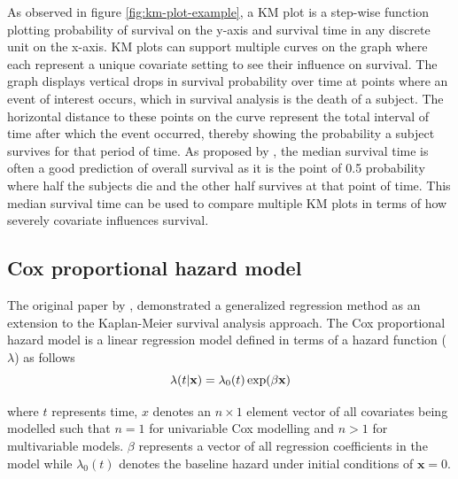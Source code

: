 \documentclass{l4proj}
\begin{document}
As observed in figure \ref{fig:km-plot-example}, a KM plot is a step-wise function plotting probability of survival on the y-axis and survival time in any discrete unit on the x-axis. KM plots can support multiple curves on the graph where each represent a unique covariate setting to see their influence on survival. The graph displays vertical drops in survival probability over time at points where an event of interest occurs, which in survival analysis is the death of a subject. The horizontal distance to these points on the curve represent the total interval of time after which the event occurred, thereby showing the probability a subject survives for that period of time. As proposed by \cite{bewick2004statistics}, the median survival time is often a good prediction of overall survival as it is the point of 0.5 probability where half the subjects die and the other half survives at that point of time. This median survival time can be used to compare multiple KM plots in terms of how severely  covariate influences survival. 


\subsection{Cox proportional hazard model} \label{cph-background}
The original paper by \cite{cox1972regression}, demonstrated a generalized regression method as an extension to the Kaplan-Meier survival analysis approach. The Cox proportional hazard model is a linear regression model defined in terms of a hazard function (\(\lambda\)) as follows
\begin{equation}
    \centering
    \lambda (t | \textbf{x}) = \lambda_0 (t) \exp (\beta \textbf{x})
    \label{eq:hazard model}
\end{equation}

where \(t\) represents time, \textbf{\(x\)} denotes an \(n \times 1\) element vector of all covariates being modelled such that \(n=1\) for univariable Cox modelling and \(n > 1\) for multivariable models. \(\beta\) represents a vector of all regression coefficients in the model while \(\lambda_0 (t)\) denotes the baseline hazard under initial conditions of \(\textbf{x} = 0\). 
\end{document}
